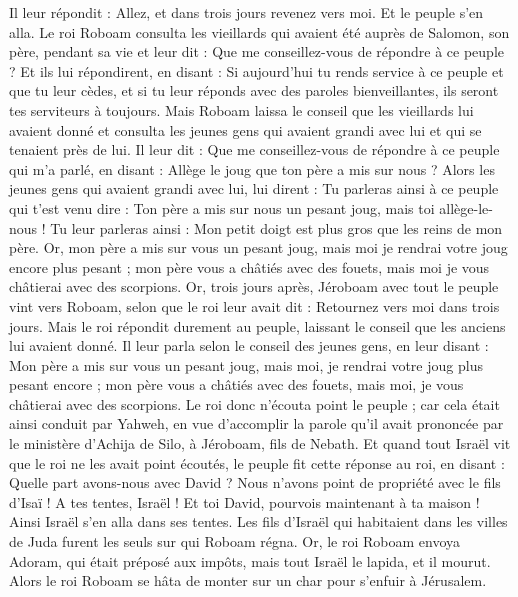 \begin{multicols}{2}
Il leur répondit : Allez, et dans trois jours revenez vers moi. Et le peuple s'en alla.
Le roi Roboam consulta les vieillards qui avaient été auprès de Salomon, son père, pendant sa vie et leur dit : Que me conseillez-vous de répondre à ce peuple ?
Et ils lui répondirent, en disant : Si aujourd'hui tu rends service à ce peuple et que tu leur cèdes, et si tu leur réponds avec des paroles bienveillantes, ils seront tes serviteurs à toujours.
Mais Roboam laissa le conseil que les vieillards lui avaient donné et consulta les jeunes gens qui avaient grandi avec lui et qui se tenaient près de lui.
Il leur dit : Que me conseillez-vous de répondre à ce peuple qui m'a parlé, en disant : Allège le joug que ton père a mis sur nous ?
Alors les jeunes gens qui avaient grandi avec lui, lui dirent : Tu parleras ainsi à ce peuple qui t'est venu dire : Ton père a mis sur nous un pesant joug, mais toi allège-le-nous ! Tu leur parleras ainsi : Mon petit doigt est plus gros que les reins de mon père.
Or, mon père a mis sur vous un pesant joug, mais moi je rendrai votre joug encore plus pesant ; mon père vous a châtiés avec des fouets, mais moi je vous châtierai avec des scorpions.
Or, trois jours après, Jéroboam avec tout le peuple vint vers Roboam, selon que le roi leur avait dit : Retournez vers moi dans trois jours.
Mais le roi répondit durement au peuple, laissant le conseil que les anciens lui avaient donné.
Il leur parla selon le conseil des jeunes gens, en leur disant : Mon père a mis sur vous un pesant joug, mais moi, je rendrai votre joug plus pesant encore ; mon père vous a châtiés avec des fouets, mais moi, je vous châtierai avec des scorpions.
Le roi donc n'écouta point le peuple ; car cela était ainsi conduit par Yahweh, en vue d’accomplir la parole qu'il avait prononcée par le ministère d'Achija de Silo, à Jéroboam, fils de Nebath.
Et quand tout Israël vit que le roi ne les avait point écoutés, le peuple fit cette réponse au roi, en disant : Quelle part avons-nous avec David ? Nous n'avons point de propriété avec le fils d'Isaï ! A tes tentes, Israël ! Et toi David, pourvois maintenant à ta maison ! Ainsi Israël s'en alla dans ses tentes.
Les fils d'Israël qui habitaient dans les villes de Juda furent les seuls sur qui Roboam régna.
Or, le roi Roboam envoya Adoram, qui était préposé aux impôts, mais tout Israël le lapida, et il mourut. Alors le roi Roboam se hâta de monter sur un char pour s'enfuir à Jérusalem.

\end{multicols}
